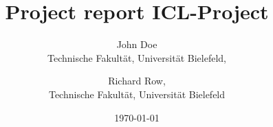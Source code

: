 \documentclass[a4paper,fontsize=10pt,dvipsnames]{scrreprt}
\begin{document}
\title{Project report ICL-Project}
\date{\today}
\author{John Doe\\ Technische Fakult\"at, Universit\"at Bielefeld, 
        \and Richard Row, \\ Technische Fakult\"at, Universit\"at Bielefeld}
\maketitle

\setcounter{page}{0}
\thispagestyle{empty}
\tableofcontents
\clearpage

\listoftodos
\clearpage

\setcounter{page}{0}



\newpage
{}
{}


\newpage
\appendix

\end{document}
